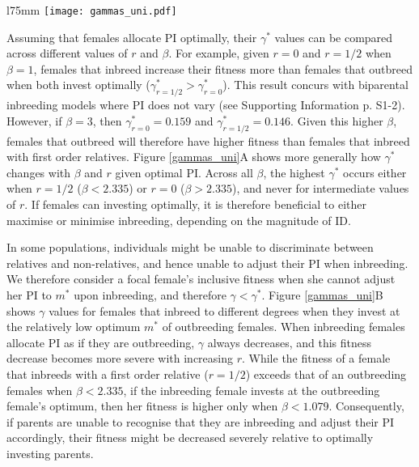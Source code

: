 \documentclass[10pt,letterpaper]{article}
\begin{document}
\begin{wrapfigure}[25]{l}{75mm}
\texttt{[image: gammas\_uni.pdf]}
\captionsetup{labelformat=empty} 
\caption{} 
\label{gammas_uni} %
\end{wrapfigure} %
Assuming that females allocate PI optimally, their $\gamma^{*}$ values can be compared across different values of $r$ and $\beta$. For example, given $r=0$ and $r=1/2$ when $\beta=1$, females that inbreed increase their fitness more than females that outbreed when both invest optimally ($\gamma^{*}_{r=1/2}>\gamma^{*}_{r=0}$). This result concurs with biparental inbreeding models where PI does not vary (see Supporting Information p. S1-2). However, if $\beta=3$, then $\gamma^{*}_{r=0}=0.159$ and $\gamma^{*}_{r=1/2}=0.146$. Given this higher $\beta$, females that outbreed will therefore have higher fitness than females that inbreed with first order relatives. Figure \ref{gammas_uni}A shows more generally how $\gamma^{*}$ changes with $\beta$ and $r$ given optimal PI. Across all $\beta$, the highest $\gamma^{*}$ occurs either when $r=1/2$ ($\beta < 2.335$) or $r=0$ ($\beta > 2.335$), and never for intermediate values of $r$. If females can investing optimally, it is therefore beneficial to either maximise or minimise inbreeding, depending on the magnitude of ID.

In some populations, individuals might be unable to discriminate between relatives and non-relatives, and hence unable to adjust their PI when inbreeding. We therefore consider a focal female's inclusive fitness when she cannot adjust her PI to $m^{*}$ upon inbreeding, and therefore $\gamma < \gamma^{*}$. Figure \ref{gammas_uni}B shows $\gamma$ values for females that inbreed to different degrees when they invest at the relatively low optimum $m^{*}$ of outbreeding females. When inbreeding females allocate PI as if they are outbreeding, $\gamma$ always decreases, and this fitness decrease becomes more severe with increasing $r$. While the fitness of a female that inbreeds with a first order relative ($r=1/2$) exceeds that of an outbreeding females when $\beta < 2.335$, if the inbreeding female invests at the outbreeding female's optimum, then her fitness is higher only when $\beta < 1.079$. Consequently, if parents are unable to recognise that they are inbreeding and adjust their PI accordingly, their fitness might be decreased severely relative to optimally investing parents.
\end{document}
